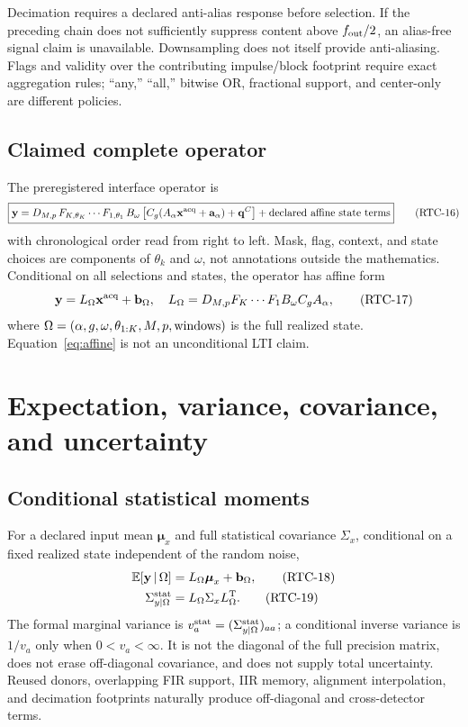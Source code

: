 \documentclass[11pt]{article}
\newcommand{\given}{\,\vert\,}
\newcommand{\E}{\mathbb{E}}
\begin{document}
Decimation requires a declared anti-alias response before selection.  If the
preceding chain does not sufficiently suppress content above
$f_{\rm out}/2$, an alias-free signal claim is unavailable.  Downsampling does
not itself provide anti-aliasing.  Flags and validity over the contributing
impulse/block footprint require exact aggregation rules; ``any,'' ``all,''
bitwise OR, fractional support, and center-only are different policies.

\subsection{Claimed complete operator}

The preregistered interface operator is
\begin{equation}
 \boxed{
 \mathbf y=
 D_{M,p}\,F_{K,\theta_K}\cdots F_{1,\theta_1}\,
 B_{\omega}\left[C_g(A_{\alpha}\mathbf x^{\rm acq}
 +\mathbf a_{\alpha})+\mathbf q^C\right]
 +\hbox{declared affine state terms}}
 \tag{RTC-16}\label{eq:claimed}
\end{equation}
with chronological order read from right to left.  Mask, flag, context, and
state choices are components of $\theta_k$ and $\omega$, not annotations
outside the mathematics.  Conditional on all selections and states, the
operator has affine form
\begin{equation}
 \mathbf y=L_{\Omega}\mathbf x^{\rm acq}+\mathbf b_{\Omega},
 \quad
 L_{\Omega}=D_{M,p}F_{K}\cdots F_1B_{\omega}C_gA_{\alpha},
 \tag{RTC-17}\label{eq:affine}
\end{equation}
where $\Omega=(\alpha,g,\omega,\theta_{1:K},M,p,\hbox{windows})$ is the full
realized state.  Equation~\eqref{eq:affine} is not an unconditional LTI claim.

\section{Expectation, variance, covariance, and uncertainty}

\subsection{Conditional statistical moments}

For a declared input mean $\boldsymbol\mu_x$ and full statistical covariance
$\Sigma_x$, conditional on a fixed realized state independent of the random
noise,
\begin{align}
 \E[\mathbf y\given\Omega]
   &=L_{\Omega}\boldsymbol\mu_x+\mathbf b_{\Omega},
 \tag{RTC-18}\label{eq:mean}\\
 \Sigma^{\rm stat}_{y\mid\Omega}
   &=L_{\Omega}\Sigma_xL_{\Omega}^{\mathrm T}.
 \tag{RTC-19}\label{eq:cov}
\end{align}
The formal marginal variance is
$v^{\rm stat}_{a}=(\Sigma^{\rm stat}_{y\mid\Omega})_{aa}$; a conditional
inverse variance is $1/v_a$ only when $0<v_a<\infty$.  It is not the diagonal
of the full precision matrix, does not erase off-diagonal covariance, and does
not supply total uncertainty.  Reused donors, overlapping FIR support, IIR
memory, alignment interpolation, and decimation footprints naturally produce
off-diagonal and cross-detector terms.
\end{document}
